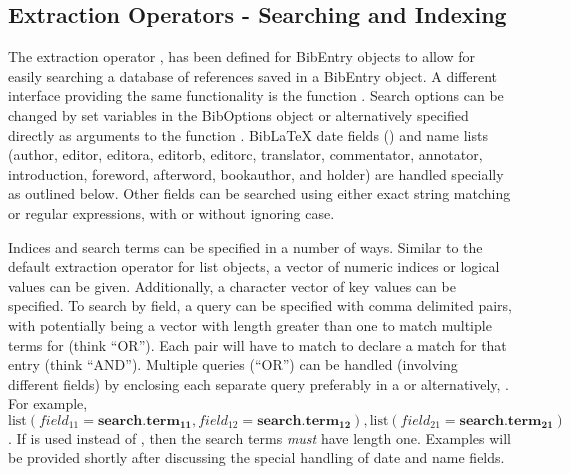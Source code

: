 \documentclass[article]{jss}\usepackage[]{graphicx}\usepackage[]{color}
\begin{document}
\subsection{Extraction Operators - Searching and Indexing}\label{searchsec}
The extraction operator \code{'['}, has been defined for BibEntry objects to allow for easily searching a database of references saved in a BibEntry object.  A different interface providing the same functionality is the function .  Search options can be changed by set variables in the BibOptions object or alternatively specified directly as arguments to the function .  BibLaTeX date fields () and name lists (author, editor, editora, editorb, editorc, translator, commentator, annotator, introduction, foreword, afterword, bookauthor, and holder) are handled specially as outlined below.  Other fields can be searched using either exact string matching or regular expressions, with or without ignoring case.

Indices and search terms can be specified in a number of ways.  Similar to the default extraction operator for list objects, a vector of numeric indices or logical values can be given.  Additionally, a character vector of key values can be specified.  To search by field, a query can be specified with comma delimited  pairs, with  potentially being a vector with length greater than one to match multiple terms for  (think ``OR'').  Each  pair will have to match to declare a match for that entry (think ``AND'').  Multiple queries (``OR'') can be handled (involving different fields) by enclosing each separate query preferably in a  or alternatively, .  For example, $\text{list}(field_{11} = \mathbf{search.term_{11}},field_{12}=\mathbf{search.term_{12}}),\text{list}(field_{21}=\mathbf{search.term_{21}})$.  If  is used instead of , then the search terms \emph{must} have length one.  Examples will be provided shortly after discussing the special handling of date and name fields.  
\end{document}
